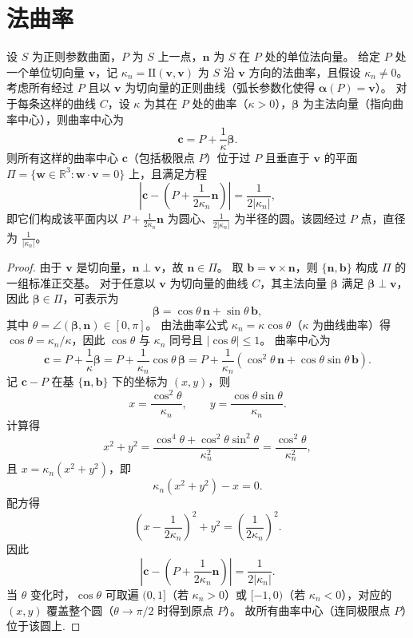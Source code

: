 \documentclass[../../main.tex]{subfiles}%
\begin{document}
\section{法曲率}

\begin{theorem}
设 $S$ 为正则参数曲面，$P$ 为 $S$ 上一点，$\boldsymbol{n}$ 为 $S$ 在 $P$ 处的单位法向量。
给定 $P$ 处一个单位切向量 $\boldsymbol{v}$，记 $\kappa_n = \mathrm{I\!I}(\boldsymbol{v},\boldsymbol{v})$ 为 $S$ 沿 $\boldsymbol{v}$ 方向的法曲率，且假设 $\kappa_n \neq 0$。
考虑所有经过 $P$ 且以 $\boldsymbol{v}$ 为切向量的正则曲线（弧长参数化使得 $\boldsymbol{\alpha}(P)=\boldsymbol{v}$）。
对于每条这样的曲线 $C$，设 $\kappa$ 为其在 $P$ 处的曲率（$\kappa>0$），$\boldsymbol{\beta}$ 为主法向量（指向曲率中心），则曲率中心为
\[
\boldsymbol{c} = P + \frac{1}{\kappa}\boldsymbol{\beta}.
\]
则所有这样的曲率中心 $\boldsymbol{c}$（包括极限点 $P$）位于过 $P$ 且垂直于 $\boldsymbol{v}$ 的平面 $\Pi = \{\boldsymbol{w}\in\mathbb{R}^3: \boldsymbol{w}\cdot\boldsymbol{v}=0\}$ 上，且满足方程
\[
\left|\boldsymbol{c} - \left(P + \frac{1}{2\kappa_n}\boldsymbol{n}\right)\right| = \frac{1}{2|\kappa_n|},
\]
即它们构成该平面内以 $P + \frac{1}{2\kappa_n}\boldsymbol{n}$ 为圆心、$\frac{1}{2|\kappa_n|}$ 为半径的圆。该圆经过 $P$ 点，直径为 $\frac{1}{|\kappa_n|}$。
\end{theorem}
\begin{proof}
由于 $\boldsymbol{v}$ 是切向量，$\boldsymbol{n}\perp\boldsymbol{v}$，故 $\boldsymbol{n}\in\Pi$。
取 $\boldsymbol{b} = \boldsymbol{v}\times\boldsymbol{n}$，则 $\{\boldsymbol{n},\boldsymbol{b}\}$ 构成 $\Pi$ 的一组标准正交基。
对于任意以 $\boldsymbol{v}$ 为切向量的曲线 $C$，其主法向量 $\boldsymbol{\beta}$ 满足 $\boldsymbol{\beta}\perp\boldsymbol{v}$，因此 $\boldsymbol{\beta}\in\Pi$，可表示为
\[
\boldsymbol{\beta} = \cos\theta\,\boldsymbol{n} + \sin\theta\,\boldsymbol{b},
\]
其中 $\theta = \angle(\boldsymbol{\beta},\boldsymbol{n})\in[0,\pi]$。
由法曲率公式 $\kappa_n = \kappa\cos\theta$（$\kappa$ 为曲线曲率）得 $\cos\theta = \kappa_n/\kappa$，因此 $\cos\theta$ 与 $\kappa_n$ 同号且 $|\cos\theta|\leqslant 1$。
曲率中心为
\[
\boldsymbol{c} = P + \frac{1}{\kappa}\boldsymbol{\beta}
= P + \frac{1}{\kappa_n}\cos\theta\,\boldsymbol{\beta}
= P + \frac{1}{\kappa_n}\left(\cos^2\theta\,\boldsymbol{n} + \cos\theta\sin\theta\,\boldsymbol{b}\right).
\]
记 $\boldsymbol{c}-P$ 在基 $\{\boldsymbol{n},\boldsymbol{b}\}$ 下的坐标为 $(x,y)$，则
\[
x = \frac{\cos^2\theta}{\kappa_n},\qquad y = \frac{\cos\theta\sin\theta}{\kappa_n}.
\]
计算得
\[
x^2+y^2 = \frac{\cos^4\theta+\cos^2\theta\sin^2\theta}{\kappa_n^2} = \frac{\cos^2\theta}{\kappa_n^2},
\]
且 $x = \kappa_n(x^2+y^2)$，即
\[
\kappa_n(x^2+y^2) - x = 0.
\]
配方得
\[
\left(x - \frac{1}{2\kappa_n}\right)^2 + y^2 = \left(\frac{1}{2\kappa_n}\right)^2.
\]
因此
\[
\left|\boldsymbol{c} - \left(P + \frac{1}{2\kappa_n}\boldsymbol{n}\right)\right| = \frac{1}{2|\kappa_n|}.
\]
当 $\theta$ 变化时，$\cos\theta$ 可取遍 $(0,1]$（若 $\kappa_n>0$）或 $[-1,0)$（若 $\kappa_n<0$），对应的 $(x,y)$ 覆盖整个圆（$\theta\to\pi/2$ 时得到原点 $P$）。
故所有曲率中心（连同极限点 $P$）位于该圆上.
\end{proof}
\end{document}
